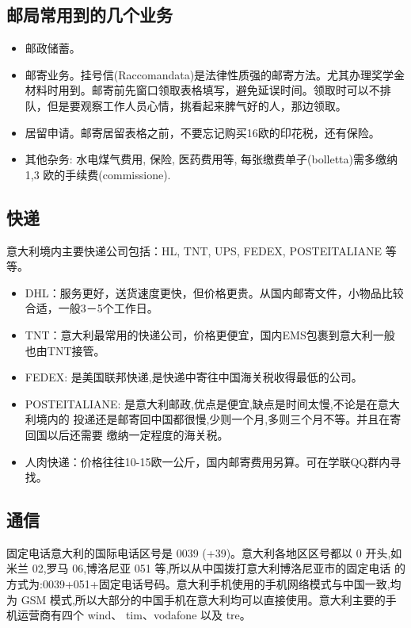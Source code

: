 \subsection{邮局常用到的几个业务}
\begin{itemize}
\item 邮政储蓄。
\item 邮寄业务。挂号信(Raccomandata)是法律性质强的邮寄方法。尤其办理奖学金材料时用到。邮寄前先窗口领取表格填写，避免延误时间。领取时可以不排队，但是要观察工作人员心情，挑看起来脾气好的人，那边领取。
\item 居留申请。邮寄居留表格之前，不要忘记购买16欧的印花税，还有保险。
\item 其他杂务: 水电煤气费用, 保险, 医药费用等, 每张缴费单子(bolletta)需多缴纳1,3 欧的手续费(commissione).

\end{itemize}

\subsection{快递}
意大利境内主要快递公司包括：HL, TNT, UPS, FEDEX, POSTEITALIANE 等等。
\begin{itemize}
\item DHL：服务更好，送货速度更快，但价格更贵。从国内邮寄文件，小物品比较合适，一般3－5个工作日。
\item TNT：意大利最常用的快递公司，价格更便宜，国内EMS包裹到意大利一般也由TNT接管。
\item FEDEX: 是美国联邦快递,是快递中寄往中国海关税收得最低的公司。
\item POSTEITALIANE: 是意大利邮政,优点是便宜,缺点是时间太慢,不论是在意大利境内的 投递还是邮寄回中国都很慢,少则一个月,多则三个月不等。并且在寄回国以后还需要
缴纳一定程度的海关税。
\item 人肉快递：价格往往10-15欧一公斤，国内邮寄费用另算。可在学联QQ群内寻找。
\end{itemize}

\subsection{通信}
固定电话意大利的国际电话区号是 0039 (+39)。意大利各地区区号都以 0 开头,如米兰 02,罗马 06,博洛尼亚 051 等,所以从中国拨打意大利博洛尼亚市的固定电话 的方式为:0039+051+固定电话号码。意大利手机使用的手机网络模式与中国一致,均为 GSM 模式,所以大部分的中国手机在意大利均可以直接使用。意大利主要的手机运营商有四个 wind、 tim、vodafone 以及 tre。 

